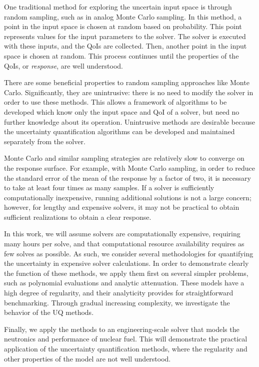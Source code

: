 One traditional method for exploring the uncertain input space is through random sampling, such as in analog Monte
Carlo sampling.  In this method, a point in the input space is chosen at random based on probability.  This
point represents values for the input parameters to the solver.  The solver is executed with these inputs, and
the QoIs are collected.  Then, another point in the input space is chosen at random.  This process continues
until the properties of the QoIs, or \emph{response}, are well understood.

There are some beneficial properties to random sampling approaches like Monte Carlo.  
Significantly, they are unintrusive:
 there is no need to modify the solver in order to use these methods.  This allows a framework of
algorithms to be developed which know only the input space and QoI of a solver, but need no further knowledge
about its operation.  Unintrusive methods are desirable because the uncertainty quantification algorithms can
be developed and maintained separately from the solver.

Monte Carlo and similar sampling strategies are relatively slow to converge on the response surface.  For
example, with Monte Carlo sampling, in order to reduce the standard error of the mean of the response by a factor
of two, it is necessary to take at least four times as many samples.  If a solver is sufficiently computationally
inexpensive, running additional solutions is not a large concern; however, for lengthy and expensive solvers,
it may not be practical to obtain sufficient realizations to obtain a clear response.

In this work, we will assume solvers are computationally expensive, requiring many hours per solve, and that
computational resource availability requires as few solves as possible.  As such, we consider several methodologies 
for quantifying the uncertainty in expensive solver
calculations.  In order to demonstrate clearly the function of these methods, we apply them first on
several simpler problems, such as polynomial evaluations and analytic attenuation.  These models have a high
degree of regularity, and their analyticity provides for straightforward benchmarking.  Through gradual
increasing complexity, we investigate the behavior of the UQ methods.

Finally, we apply the methods to an engineering-scale solver that
models the neutronics and performance of nuclear fuel.  This will
demonstrate the practical application of the uncertainty quantification methods, where the regularity and
other properties of the model are not well understood.

